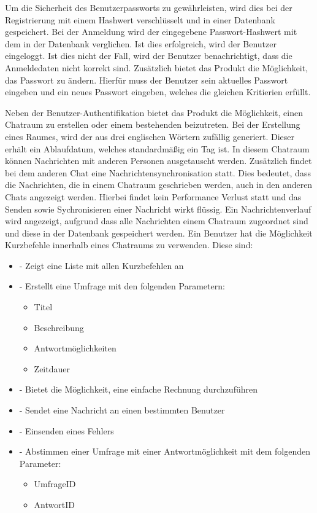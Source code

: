 Um die Sicherheit des Benutzerpassworts zu gewährleisten, wird dies bei der Registrierung mit einem Hashwert verschlüsselt und in einer Datenbank gespeichert.
Bei der Anmeldung wird der eingegebene Passwort-Hashwert mit dem in der Datenbank verglichen.
Ist dies erfolgreich, wird der Benutzer eingeloggt.
Ist dies nicht der Fall, wird der Benutzer benachrichtigt, dass die Anmeldedaten nicht korrekt sind. Zusätzlich bietet das Produkt die Möglichkeit, das Passwort zu ändern.
Hierfür muss der Benutzer sein aktuelles Passwort eingeben und ein neues Passwort eingeben, welches die gleichen Kritierien erfüllt.

\noindent
Neben der Benutzer-Authentifikation bietet das Produkt die Möglichkeit, einen Chatraum zu erstellen oder einem bestehenden beizutreten.
Bei der Erstellung eines Raumes, wird der  aus drei englischen Wörtern zufällig generiert.
Dieser erhält ein Ablaufdatum, welches standardmäßig ein Tag ist.
In diesem Chatraum können Nachrichten mit anderen Personen ausgetauscht werden.
Zusätzlich findet bei dem anderen Chat eine Nachrichtensynchronisation statt.
Dies bedeutet, dass die Nachrichten, die in einem Chatraum geschrieben werden, auch in den anderen Chats angezeigt werden.
Hierbei findet kein Performance Verlust statt und das Senden sowie Sychronisieren einer Nachricht wirkt flüssig.
Ein Nachrichtenverlauf wird angezeigt, aufgrund dass alle Nachrichten einem Chatraum zugeordnet sind und diese in der Datenbank gespeichert werden.
Ein Benutzer hat die Möglichkeit Kurzbefehle innerhalb eines Chatraums zu verwenden.
Diese sind:
\begin{itemize}
  \item {} - Zeigt eine Liste mit allen Kurzbefehlen an
  \item {} - Erstellt eine Umfrage mit den folgenden Parametern:
  \begin{itemize}
    \item Titel
    \item Beschreibung
    \item Antwortmöglichkeiten
    \item Zeitdauer
  \end{itemize}
  \item {} - Bietet die Möglichkeit, eine einfache Rechnung durchzuführen
  \item {} - Sendet eine Nachricht an einen bestimmten Benutzer
  \item {} - Einsenden eines Fehlers
  \item {} - Abstimmen einer Umfrage mit einer Antwortmöglichkeit mit dem folgenden Parameter:
  \begin{itemize}
    \item UmfrageID
    \item AntwortID
  \end{itemize}
\end{itemize}

